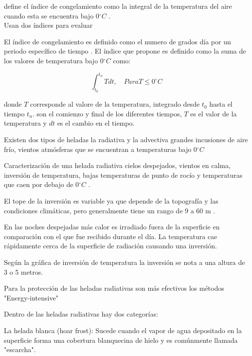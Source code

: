 \documentclass[11pt]{article}
\def\celc{$^{\circ}C$ }%
\begin{document}
\citet{prabha2008evaluation} define el índice de congelamiento como la integral de la temperatura del aire cuando esta se encuentra bajo 0\celc.\\

\citet{prabha2008evaluation} Usan dos índices para evaluar

El índice de congelamiento es definido como el numero de grados día por un periodo específico de tiempo \citep{frauenfeld2007northern}. El índice que propone \citet{frauenfeld2007northern} es definido como la suma de los valores de temperatura bajo 0\celc como:

\begin{equation}\label{eq:frost_index}
    \int_{t_0}^{t_n} T dt,\quad Para T \leq 0^{\circ}C
\end{equation}

donde $T$ corresponde al valore de la temperatura, integrado desde $t_0$ hasta el tiempo $t_n$. son el comienzo y final de los diferentes tiempos, $T$ es el valor de la temperatura y $dt$ es el cambio en el tiempo.

Existen dos tipos de heladas la radiativa y la advectiva \citep{snyder2005frost} grandes incusiones de aire frío, vientos atmósferas que se encuentran a temperaturas bajo 0\celc 

Caracterización de una helada radiativa cielos despejados, vientos en calma, inversión de temperatura, bajas temperaturas de punto de rocío y temperaturas que caen por debajo de 0\celc.

El tope de la inversión es variable ya que depende de la topografía y las condiciones climáticas, pero generalmente tiene un rango de 9 a 60 m \citep{snyder2005frost}.

En las noches despejadas más calor es irradiado fuera de la superficie en comparación con el que fue recibido durante el día. La temperatura cae rápidamente cerca de la superficie de radiación causando una inversión.

Según la gráfica de inversión de temperatura la inversión se nota a una altura de 3 o 5 metros. 

Para la protección de las heladas radiativas son más efectivos los métodos "Energy-intensive"

Dentro de las heladas radiativas hay dos categorías:

La helada blanca (hoar frost): Sucede cuando el vapor de agua depositado en la superficie forma una cobertura blanquecina de hielo y es comúnmente llamada "escarcha".
\end{document}
